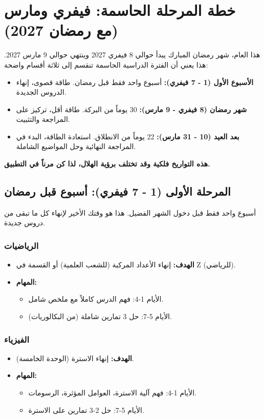 \documentclass[12pt,a4paper]{book}
\newcommand{\importantAr}[1]{%
	\begin{important}
		\bfseries #1
	\end{important}
}
\begin{document}
	\section{خطة المرحلة الحاسمة: فيفري ومارس (مع رمضان 2027)}
	
	هذا العام، شهر رمضان المبارك يبدأ حوالي 8 فيفري 2027 وينتهي حوالي 9 مارس 2027. هذا يعني أن الفترة الدراسية الحاسمة تنقسم إلى ثلاثة أقسام واضحة:
	\begin{itemize}
		\item \textbf{الأسبوع الأول (1 - 7 فيفري):} أسبوع واحد فقط قبل رمضان. طاقة قصوى، إنهاء الدروس الجديدة.
		\item \textbf{شهر رمضان (8 فيفري - 9 مارس):} 30 يوماً من البركة. طاقة أقل، تركيز على المراجعة والتثبيت.
		\item \textbf{بعد العيد (10 - 31 مارس):} 22 يوماً من الانطلاق. استعادة الطاقة، البدء في المراجعة النهائية وحل المواضيع الشاملة.
	\end{itemize}
	
	\importantAr{هذه التواريخ فلكية وقد تختلف برؤية الهلال، لذا كن مرناً في التطبيق.}
	
	\subsection{المرحلة الأولى (1 - 7 فيفري): أسبوع قبل رمضان}
	أسبوع واحد فقط قبل دخول الشهر الفضيل. هذا هو وقتك الأخير لإنهاء كل ما تبقى من دروس جديدة.
	
	\subsubsection*{الرياضيات}
	\begin{itemize}
		\item \textbf{الهدف:} إنهاء الأعداد المركبة (للشعب العلمية) أو القسمة في Z (للرياضي).
		\item \textbf{المهام:}
		\begin{itemize}
			\item الأيام 1-4: فهم الدرس كاملاً مع ملخص شامل.
			\item الأيام 5-7: حل 3 تمارين شاملة (من البكالوريات).
		\end{itemize}
	\end{itemize}
	
	\subsubsection*{الفيزياء}
	\begin{itemize}
		\item \textbf{الهدف:} إنهاء الاسترة (الوحدة الخامسة).
		\item \textbf{المهام:}
		\begin{itemize}
			\item الأيام 1-4: فهم آلية الاسترة، العوامل المؤثرة، الرسومات.
			\item الأيام 5-7: حل 2-3 تمارين على الاسترة.
		\end{itemize}
	\end{itemize}
	
\end{document}
